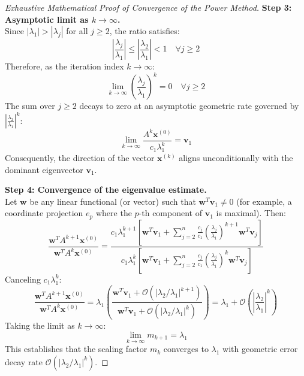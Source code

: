 \begin{proof}[Exhaustive Mathematical Proof of Convergence of the Power Method]
\noindent\textbf{Step 3: Asymptotic limit as $k \to \infty$.} \\
Since $|\lambda_1| > |\lambda_j|$ for all $j \ge 2$, the ratio satisfies:
\begin{equation}
    \left| \frac{\lambda_j}{\lambda_1} \right| \le \left| \frac{\lambda_2}{\lambda_1} \right| < 1 \quad \forall j \ge 2
\end{equation}
Therefore, as the iteration index $k \to \infty$:
\begin{equation}
    \lim_{k \to \infty} \left(\frac{\lambda_j}{\lambda_1}\right)^k = 0 \quad \forall j \ge 2
\end{equation}
The sum over $j \ge 2$ decays to zero at an asymptotic geometric rate governed by $\left|\frac{\lambda_2}{\lambda_1}\right|^k$:
\begin{equation}
    \lim_{k \to \infty} \frac{A^k \mathbf{x}^{(0)}}{c_1 \lambda_1^k} = \mathbf{v}_1
\end{equation}
Consequently, the direction of the vector $\mathbf{x}^{(k)}$ aligns unconditionally with the dominant eigenvector $\mathbf{v}_1$.

\medskip
\noindent\textbf{Step 4: Convergence of the eigenvalue estimate.} \\
Let $\mathbf{w}$ be any linear functional (or vector) such that $\mathbf{w}^T \mathbf{v}_1 \ne 0$ (for example, a coordinate projection $e_p$ where the $p$-th component of $\mathbf{v}_1$ is maximal). Then:
\begin{equation}
    \frac{\mathbf{w}^T A^{k+1} \mathbf{x}^{(0)}}{\mathbf{w}^T A^k \mathbf{x}^{(0)}} = \frac{c_1 \lambda_1^{k+1} \left[ \mathbf{w}^T \mathbf{v}_1 + \sum_{j=2}^n \frac{c_j}{c_1} \left(\frac{\lambda_j}{\lambda_1}\right)^{k+1} \mathbf{w}^T \mathbf{v}_j \right]}{c_1 \lambda_1^k \left[ \mathbf{w}^T \mathbf{v}_1 + \sum_{j=2}^n \frac{c_j}{c_1} \left(\frac{\lambda_j}{\lambda_1}\right)^k \mathbf{w}^T \mathbf{v}_j \right]}
\end{equation}
Canceling $c_1 \lambda_1^k$:
\begin{equation}
    \frac{\mathbf{w}^T A^{k+1} \mathbf{x}^{(0)}}{\mathbf{w}^T A^k \mathbf{x}^{(0)}} = \lambda_1 \left( \frac{\mathbf{w}^T \mathbf{v}_1 + \mathcal{O}\left( |\lambda_2 / \lambda_1|^{k+1} \right)}{\mathbf{w}^T \mathbf{v}_1 + \mathcal{O}\left( |\lambda_2 / \lambda_1|^k \right)} \right) = \lambda_1 + \mathcal{O}\left( \left|\frac{\lambda_2}{\lambda_1}\right|^k \right)
\end{equation}
Taking the limit as $k \to \infty$:
\begin{equation}
    \boxed{\lim_{k \to \infty} m_{k+1} = \lambda_1}
\end{equation}
This establishes that the scaling factor $m_k$ converges to $\lambda_1$ with geometric error decay rate $\mathcal{O}\left(|\lambda_2 / \lambda_1|^k\right)$.
\end{proof}


